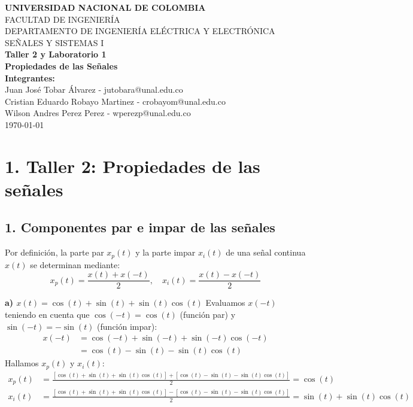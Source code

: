 \documentclass[12pt]{article}
\begin{document}
\begin{titlepage}
    \centering
    \vspace*{2cm}
    
    {\Large \textbf{UNIVERSIDAD NACIONAL DE COLOMBIA}}\\[0.5cm]
    {\large FACULTAD DE INGENIERÍA}\\[0.5cm]
    {\large DEPARTAMENTO DE INGENIERÍA ELÉCTRICA Y ELECTRÓNICA}\\[0.5cm]
    {\large SEÑALES Y SISTEMAS I}\\[2cm]
    
    {\Huge \textbf{Taller 2 y Laboratorio 1}}\\[0.5cm]
    {\Large \textbf{Propiedades de las Señales}}\\[3cm]
    
    {\large \textbf{Integrantes:}}\\[0.5cm]
    {\large Juan José Tobar Álvarez - jutobara@unal.edu.co}\\[0.2cm]
    {\large Cristian Eduardo Robayo Martinez - crobayom@unal.edu.co}\\[0.2cm]
    {\large Wilson Andres Perez Perez - wperezp@unal.edu.co}\\[0.2cm]
    
    \vfill
    {\large \today}\\[1cm]
\end{titlepage}

\section*{1. Taller 2: Propiedades de las señales}

\subsection*{1. Componentes par e impar de las señales}
Por definición, la parte par $x_p(t)$ y la parte impar $x_i(t)$ de una señal continua $x(t)$ se determinan mediante:
\begin{equation*}
    x_p(t) = \frac{x(t) + x(-t)}{2}, \quad x_i(t) = \frac{x(t) - x(-t)}{2}
\end{equation*}

\textbf{a) $x(t) = \cos(t) + \sin(t) + \sin(t)\cos(t)$}
Evaluamos $x(-t)$ teniendo en cuenta que $\cos(-t) = \cos(t)$ (función par) y $\sin(-t) = -\sin(t)$ (función impar):
\begin{align*}
    x(-t) &= \cos(-t) + \sin(-t) + \sin(-t)\cos(-t) \\
          &= \cos(t) - \sin(t) - \sin(t)\cos(t)
\end{align*}
Hallamos $x_p(t)$ y $x_i(t)$:
\begin{align*}
    x_p(t) &= \frac{[\cos(t) + \sin(t) + \sin(t)\cos(t)] + [\cos(t) - \sin(t) - \sin(t)\cos(t)]}{2} = \cos(t) \\
    x_i(t) &= \frac{[\cos(t) + \sin(t) + \sin(t)\cos(t)] - [\cos(t) - \sin(t) - \sin(t)\cos(t)]}{2} = \sin(t) + \sin(t)\cos(t)
\end{align*}
\end{document}
